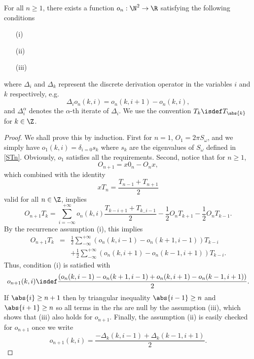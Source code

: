 \documentclass[a4paper]{article}
\begin{document}
\begin{Lem}
	\label{lemPseudoDiffOn}
	For all $n \geq 1$, there exists a function $o_n : \N^2 \to \R$ satisfying the following conditions 
	\begin{itemize} \item[(i)] 
	\item[(ii)]  
	\item[(iii)]
	\end{itemize}
	where $\Delta_i$ and $\Delta_k$ represent the discrete derivation operator in the variables $i$ and $k$ respectively, e.g. 
	\[ \Delta_i o_n(k,i) = o_n(k,i+1) - o_n(k,i),\]
	and $\Delta_i^\alpha$ denotes the $\alpha$-th iterate of $\Delta_i$. We use the convention $T_k \isdef T_{\abs{k}}$ for $k \in \Z$. 
\end{Lem}
	\begin{proof}
		We shall prove this by induction. First for $n = 1$, $O_1 = 2\pi S_\omega$, and we simply have $o_1(k,i) = \delta_{i = 0} s_k$ where $s_k$ are the eigenvalues of $S_\omega$ defined in \autoref{STn}. Obviously, $o_1$ satisfies all the requirements. Second, notice that for $n \geq 1$, 
		\[O_{n+1} = x 0_n - O_n x,\]
		which combined with the identity 
		\[x T_n = \dfrac{T_{n-1} + T_{n+1}}{2}\]
		valid for all $n \in \Z$, implies
		\[O_{n+1}T_k = \sum_{i= -\infty}^{+\infty} o_n(k,i) \dfrac{T_{k - i + 1} + T_{k _-i- 1}}{2} - \frac{1}{2} O_n T_{k+1} - \frac{1}{2} O_n T_{k - 1}.\]
		By the recurrence assumption (i), this implies 
		\begin{eqnarray*}
			O_{n+1}T_k &=& \frac{1}{2} \sum_{-\infty}^{+ \infty}\left(o_n(k,i-1) - o_n(k+1,i - 1)\right) T_{k - i} \\
			&&+ \frac{1}{2} \sum_{-\infty}^{+ \infty}\left(o_n(k,i+1) - o_n(k-1,i + 1)\right) T_{k - i}.
		\end{eqnarray*}
		Thus, condition (i) is satisfied with 
		\[o_{n+1}(k,i) \isdef \frac{\left(o_n(k,i-1) - o_n(k+1,i-1) + o_n(k,i+1) - o_n(k-1,i+1)\right)}{2}.\]
		If $\abs{i} \geq n+1$ then by triangular inequality $\abs{i-1} \geq n$ and $\abs{i+1} \geq n$ so all terms in the rhs are null by the assumption (iii), which shows that (iii) also holds for $o_{n+1}$. Finally, the assumption (ii) is easily checked for $o_{n+1}$ once we write 
		\[ o_{n+1}(k,i) = \frac{- \Delta_k(k,i-1) + \Delta_k(k-1,i+1)}{2}.\]
	\end{proof}
\end{document}
